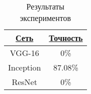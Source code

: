 \begin{table}[H]
    \centering
    \caption{Результаты экспериментов} \label{test-results}
    \begin{tabular}{|c|c|}
      \hline    
      \hyperlink{network}{Сеть} & \hyperlink{accuracy}{Точность}\\
      \hline
      VGG-16 & 0\% \\
      \hline
      Inception & 87.08\% \\
      \hline
      ResNet & 0\% \\
      \hline
    \end{tabular}
  \end{table}